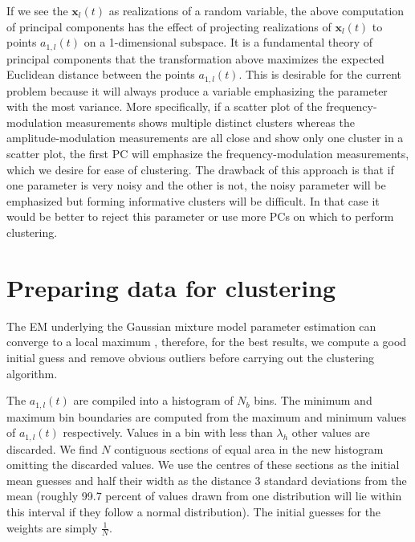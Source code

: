 If we see the $\mathbf{x}_{l}(t)$ as realizations of a random variable, the
above computation of principal components has the effect of projecting
realizations of $\mathbf{x}_{l}(t)$ to points $a_{1,l}(t)$ on a 1-dimensional
subspace. It is a fundamental theory of principal components that the
transformation above maximizes the expected Euclidean distance between the
points $a_{1,l}(t)$. This is desirable for the current problem because it will
always produce a variable emphasizing the parameter with the most variance. More
specifically, if a scatter plot of the frequency-modulation measurements shows
multiple distinct clusters whereas the amplitude-modulation measurements are all
close and show only one cluster in a scatter plot, the first PC will emphasize
the frequency-modulation measurements, which we desire for ease of clustering.
The drawback of this approach is that if one parameter is very noisy and the
other is not, the noisy parameter will be emphasized but forming informative
clusters will be difficult. In that case it would be better to reject this
parameter or use more PCs on which to perform clustering.

\section{Preparing data for clustering \label{sec:amfmseppreparecluster}}
The EM underlying the Gaussian mixture model parameter
estimation can converge to a local maximum \cite{dempster1977maximum},
therefore, for the best results, we compute a good initial guess and remove
obvious outliers before carrying out the clustering algorithm.

The $a_{1,l}(t)$ are compiled into a histogram of $N_{b}$ bins. The minimum and
maximum bin boundaries are computed from the maximum and minimum values of
$a_{1,l}(t)$ respectively. Values in a bin with less than $\lambda_{h}$ other
values are discarded. We find $N$ contiguous sections of equal area in the
new histogram omitting the discarded values.  We use the centres of these
sections as the initial mean guesses and half their width as the distance 3
standard deviations from the mean (roughly 99.7 percent of values drawn from one
distribution will lie within this interval if they follow a normal
distribution). The initial guesses for the weights are simply $\frac{1}{N}$.


